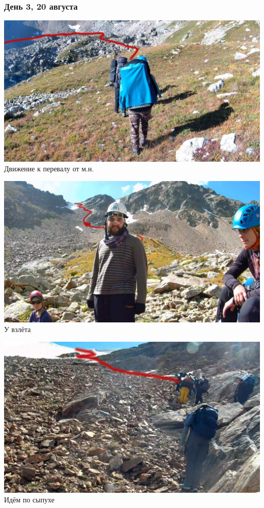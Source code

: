 \begin{frame}
	\frametitle{День 3, 20 августа}
	{\scriptsize
		\begin{minipage}{\fourpicsize}
			\centering
			\includegraphics[width=\textwidth]{../pics/20aug1.jpg}			
			Движение к перевалу от м.н.
		\end{minipage}
		\hfill
		\begin{minipage}{\fourpicsize}
			\centering
			\includegraphics[width=\textwidth]{../pics/20aug2.jpg}			
			У взлёта
		\end{minipage}
		\vfill
		\centering
		
		\begin{minipage}{\fourpicsize}
			\centering
			\includegraphics[width=\textwidth]{../pics/20aug3.jpg}			
			Идём по сыпухе		
		\end{minipage}
		\hfill
		
	}
\end{frame}

